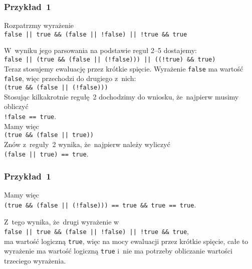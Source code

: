 \documentclass[10pt,t]{beamer}
\begin{document}
\begin{frame}
  \frametitle{Przykład~1}


  Rozpatrzmy wyrażenie \\
  \texttt{false || true \&\& (false || !false) || !true \&\& true}

  W~wyniku jego parsowania na podstawie reguł 2--5 dostajemy: \\
  \texttt{false || (true \&\& (false || (!false))) ||
    ((!true) \&\& true)} \\
  Teraz stosujemy ewaluację przez krótkie spięcie. Wyrażenie \texttt{false}
  ma wartość \texttt{false}, więc przechodzi do drugiego z~nich: \\
  \texttt{(true \&\& (false || (!false)))} \\
  Stosując kilkakrotnie regułę~2 dochodzimy do wniosku, że~najpierw musimy
  obliczyć \\
  \texttt{!false == true}. \\
  Mamy więc \\
  \texttt{(true \&\& (false || true))} \\
  Znów z~reguły~2 wynika, że~najpierw należy wyliczyć \\
  \texttt{(false || true) == true}.

\end{frame}








\begin{frame}
  \frametitle{Przykład~1}


  Mamy więc \\
  \texttt{(true \&\& (false || (!false))) == true \&\& true == true}.

  Z~tego wynika, że~drugi wyrażenie w \\
  \texttt{false || true \&\& (false || !false) || !true \&\& true}, \\
  ma wartość logiczną \texttt{true}, więc na mocy ewaluacji przez krótkie
  spięcie, całe to wyrażenie ma wartość logiczną \texttt{true} i~nie
  ma potrzeby obliczanie wartości trzeciego wyrażenia.

\end{frame}
\end{document}
